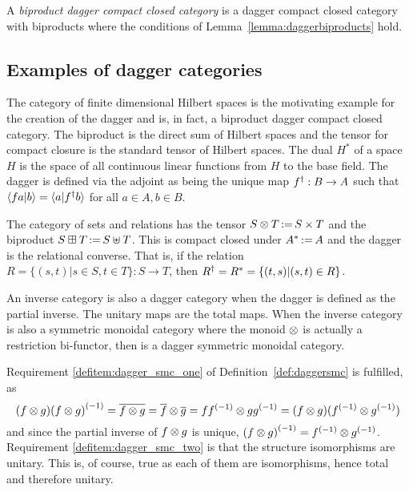 \begin{definition} \label{def:biproductdaggerccc}
  A \emph{biproduct dagger compact closed category} is a dagger compact closed category with
  biproducts where the conditions of Lemma~\ref{lemma:daggerbiproducts} hold.
\end{definition}
\subsection{Examples of dagger categories}

\begin{example}[\fdh]\label{ex:fdhilbert_is_dagger_category}
The category of finite dimensional Hilbert spaces is the motivating example for
the creation of the dagger and is, in fact, a biproduct dagger compact closed category. The
biproduct is the direct sum of Hilbert spaces and the tensor for compact closure is the standard
tensor of Hilbert spaces. The dual $H^{*}$ of a space $H$ is the space of all continuous linear
functions from $H$ to the base field. The dagger is defined via the adjoint as being the unique map
${f}^{\dagger}:B\to A$ such that $\langle f a|b\rangle = \langle a | {f}^{\dagger} b\rangle$ for all $a\in A, b\in B$.
\end{example}

\begin{example}[\rel]\label{ex:rel_is_dagger_category}
The category \rel of sets and relations has the tensor $S\otimes T \operatorname*{:\!=} S\times T$ and the biproduct
$S\boxplus T \operatorname*{:\!=} S\uplus T$. This is compact closed under $A^{*} \operatorname*{:\!=} A$ and
the dagger is the relational converse. That is, if the relation
$R=\{(s,t)|s\in S, t\in T\}:S\to T$, then ${R}^{\dagger}=R^*=\{(t,s)|(s,t)\in R\}$.
\end{example}

\begin{example}\label{ex:inverse_category_is_dagger_category}
An inverse category \X is also a dagger category when the dagger is defined as the partial inverse.
The unitary maps are the total maps. When the inverse category \X is also a
symmetric monoidal category where the monoid $\otimes$ is actually a restriction bi-functor, then \X is
a dagger symmetric monoidal category.

Requirement \ref{defitem:dagger_smc_one} of Definition~\ref{def:daggersmc}  is fulfilled, as
\[
  (f\otimes g) {(f\otimes g)}^{(-1)} = \overline{f\otimes g}=\overline{f} \otimes\overline{g} =
   f{f}^{(-1)} \otimes g {g}^{(-1)} = (f\otimes g) ({f}^{(-1)} \otimes {g}^{(-1)})
\]
and since the partial inverse of $f\otimes g$ is unique, ${(f\otimes g)}^{(-1)} = {f}^{(-1)} \otimes {g}^{(-1)}$.
Requirement \ref{defitem:dagger_smc_two} is that the structure isomorphisms are unitary. This is, of
course, true as each of them are isomorphisms, hence total and therefore unitary.
\end{example}
